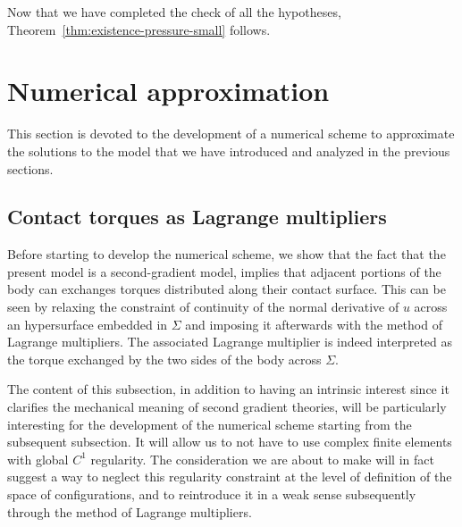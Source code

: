 \documentclass[a4paper,10pt,twoside]{amsbook}
\numberwithin{section}{chapter}
\numberwithin{equation}{chapter}
\theoremstyle{definition}
\begin{document}
Now that we have completed the check of all the hypotheses, Theorem~\ref{thm:existence-pressure-small} follows.

\section{Numerical approximation}

This section is devoted to the development of a numerical scheme to approximate the solutions to the model that we have introduced and analyzed in the previous sections.

\subsection{Contact torques as Lagrange multipliers}
\label{subsec:torques}

Before starting to develop the numerical scheme, we show that the fact that the present model is a second-gradient model, implies that adjacent portions of the body can exchanges torques distributed along their contact surface. This can be seen by relaxing the constraint of continuity of the normal derivative of $u$ across an hypersurface embedded in $\Sigma$ and imposing it afterwards with the method of Lagrange multipliers. The associated Lagrange multiplier is indeed interpreted as the torque exchanged by the two sides of the body across $\Sigma$.

The content of this subsection, in addition to having an intrinsic interest since it clarifies the mechanical meaning of second gradient theories, will be particularly interesting for the development of the numerical scheme starting from the subsequent subsection. It will allow us to not have to use complex finite elements with global $C^1$ regularity. The consideration we are about to make will in fact suggest a way to neglect this regularity constraint at the level of definition of the space of configurations, and to reintroduce it in a weak sense subsequently through the method of Lagrange multipliers.
\end{document}
